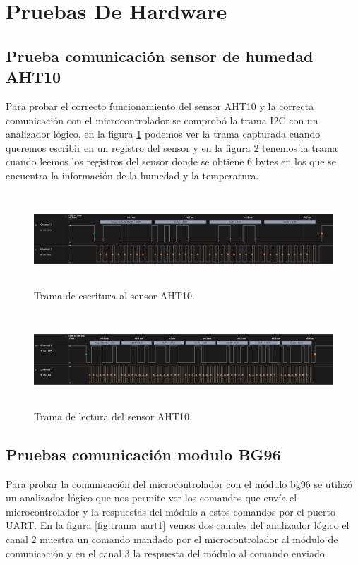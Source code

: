 \clearpage 
\section{Pruebas De Hardware}
\subsection{Prueba comunicación sensor de humedad AHT10}
Para probar el correcto funcionamiento del sensor AHT10 y la correcta comunicación con el microcontrolador se comprobó la trama I2C con un analizador lógico,
en la figura \ref{fig:write aht10} podemos ver la trama capturada cuando queremos escribir en un registro del sensor y en la figura \ref{fig:read aht10} tenemos la trama cuando leemos los registros del sensor donde se obtiene 6 bytes en los que se encuentra la información de la humedad y la temperatura.

\begin{figure}[h!]
  \centering
    \includegraphics[width=\linewidth, height=3.5cm]{./Figures/write_i2c.png}
  \caption{Trama de escritura al sensor AHT10.}
    \label{fig:write aht10}
\end{figure}

\begin{figure}[h!]
  \centering
    \includegraphics[width=\linewidth, height=3.5cm]{./Figures/read_i2c..png}
  \caption{Trama de lectura del sensor AHT10.}
    \label{fig:read aht10}
\end{figure}

\subsection{Pruebas comunicación modulo BG96}

Para probar la comunicación del microcontrolador con el módulo bg96 se utilizó un analizador lógico que nos permite ver los comandos que envía el microcontrolador y la respuestas del módulo a estos comandos por el puerto UART.
En la figura \ref{fig:trama uart1} vemos dos canales del analizador  lógico el canal 2 muestra un comando mandado por el microcontrolador al módulo de comunicación y en el canal 3 la respuesta del módulo al comando enviado.

